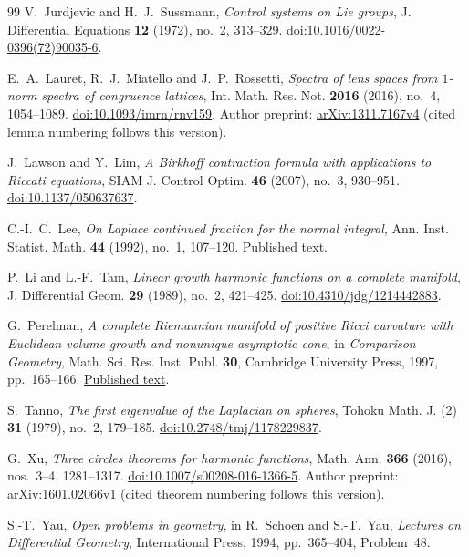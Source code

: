 \begin{thebibliography}{99}
V.~Jurdjevic and H.~J.~Sussmann,
\emph{Control systems on Lie groups},
J. Differential Equations \textbf{12} (1972), no.~2, 313--329.
\href{https://doi.org/10.1016/0022-0396(72)90035-6}{doi:10.1016/0022-0396(72)90035-6}.

E.~A.~Lauret, R.~J.~Miatello and J.~P.~Rossetti,
\emph{Spectra of lens spaces from $1$-norm spectra of congruence lattices},
Int. Math. Res. Not. \textbf{2016} (2016), no.~4, 1054--1089.
\href{https://doi.org/10.1093/imrn/rnv159}{doi:10.1093/imrn/rnv159}.
Author preprint: \href{https://arxiv.org/abs/1311.7167v4}{arXiv:1311.7167v4}
(cited lemma numbering follows this version).

J.~Lawson and Y.~Lim,
\emph{A Birkhoff contraction formula with applications to Riccati equations},
SIAM J. Control Optim. \textbf{46} (2007), no.~3, 930--951.
\href{https://doi.org/10.1137/050637637}{doi:10.1137/050637637}.

C.-I.~C.~Lee,
\emph{On Laplace continued fraction for the normal integral},
Ann. Inst. Statist. Math. \textbf{44} (1992), no.~1, 107--120.
\href{https://www.ism.ac.jp/editsec/aism/pdf/044_1_0107.pdf}{Published text}.

P.~Li and L.-F.~Tam,
\emph{Linear growth harmonic functions on a complete manifold},
J. Differential Geom. \textbf{29} (1989), no.~2, 421--425.
\href{https://doi.org/10.4310/jdg/1214442883}{doi:10.4310/jdg/1214442883}.

G.~Perelman,
\emph{A complete Riemannian manifold of positive Ricci curvature with
Euclidean volume growth and nonunique asymptotic cone},
in \emph{Comparison Geometry},
Math. Sci. Res. Inst. Publ. \textbf{30}, Cambridge University Press,
1997, pp.~165--166.
\href{https://library.slmath.org/books/Book30/files/perex.pdf}{Published text}.

S.~Tanno,
\emph{The first eigenvalue of the Laplacian on spheres},
Tohoku Math. J. (2) \textbf{31} (1979), no.~2, 179--185.
\href{https://doi.org/10.2748/tmj/1178229837}{doi:10.2748/tmj/1178229837}.

G.~Xu,
\emph{Three circles theorems for harmonic functions},
Math. Ann. \textbf{366} (2016), nos.~3--4, 1281--1317.
\href{https://doi.org/10.1007/s00208-016-1366-5}{doi:10.1007/s00208-016-1366-5}.
Author preprint: \href{https://arxiv.org/abs/1601.02066v1}{arXiv:1601.02066v1}
(cited theorem numbering follows this version).

S.-T.~Yau,
\emph{Open problems in geometry},
in R.~Schoen and S.-T.~Yau,
\emph{Lectures on Differential Geometry},
International Press, 1994, pp.~365--404, Problem~48.

\end{thebibliography}
